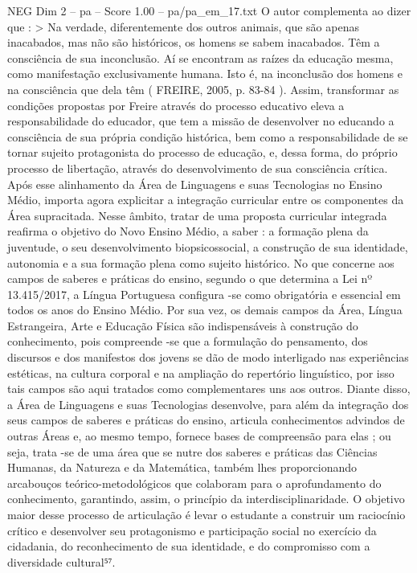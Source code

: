 \begin{textsample}{NEG Dim 2 – pa – Score 1.00 – pa/pa\_em\_17.txt}
O autor complementa ao dizer que : > Na verdade, diferentemente dos outros animais, que são apenas inacabados, mas não são históricos, os homens se sabem inacabados.
Têm a consciência de sua inconclusão.
Aí se encontram as raízes da educação mesma, como manifestação exclusivamente humana.
Isto é, na inconclusão dos homens e na consciência que dela têm ( FREIRE, 2005, p. 83-84 ).
Assim, transformar as condições propostas por Freire através do processo educativo eleva a responsabilidade do educador, que tem a missão de desenvolver no educando a consciência de sua própria condição histórica, bem como a responsabilidade de se tornar sujeito protagonista do processo de educação, e, dessa forma, do próprio processo de libertação, através do desenvolvimento de sua consciência crítica.
Após esse alinhamento da Área de Linguagens e suas Tecnologias no Ensino Médio, importa agora explicitar a integração curricular entre os componentes da Área supracitada.
Nesse âmbito, tratar de uma proposta curricular integrada reafirma o objetivo do Novo Ensino Médio, a saber : a formação plena da juventude, o seu desenvolvimento biopsicossocial, a construção de sua identidade, autonomia e a sua formação plena como sujeito histórico.
No que concerne aos campos de saberes e práticas do ensino, segundo o que determina a Lei nº 13.415/2017, a Língua Portuguesa configura -se como obrigatória e essencial em todos os anos do Ensino Médio.
Por sua vez, os demais campos da Área, Língua Estrangeira, Arte e Educação Física são indispensáveis à construção do conhecimento, pois compreende -se que a formulação do pensamento, dos discursos e dos manifestos dos jovens se dão de modo interligado nas experiências estéticas, na cultura corporal e na ampliação do repertório linguístico, por isso tais campos são aqui tratados como complementares uns aos outros.
Diante disso, a Área de Linguagens e suas Tecnologias desenvolve, para além da integração dos seus campos de saberes e práticas do ensino, articula conhecimentos advindos de outras Áreas e, ao mesmo tempo, fornece bases de compreensão para elas ; ou seja, trata -se de uma área que se nutre dos saberes e práticas das Ciências Humanas, da Natureza e da Matemática, também lhes proporcionando arcabouços teórico-metodológicos que colaboram para o aprofundamento do conhecimento, garantindo, assim, o princípio da interdisciplinaridade.
O objetivo maior desse processo de articulação é levar o estudante a construir um raciocínio crítico e desenvolver seu protagonismo e participação social no exercício da cidadania, do reconhecimento de sua identidade, e do compromisso com a diversidade cultural⁵⁷.

\end{textsample}
